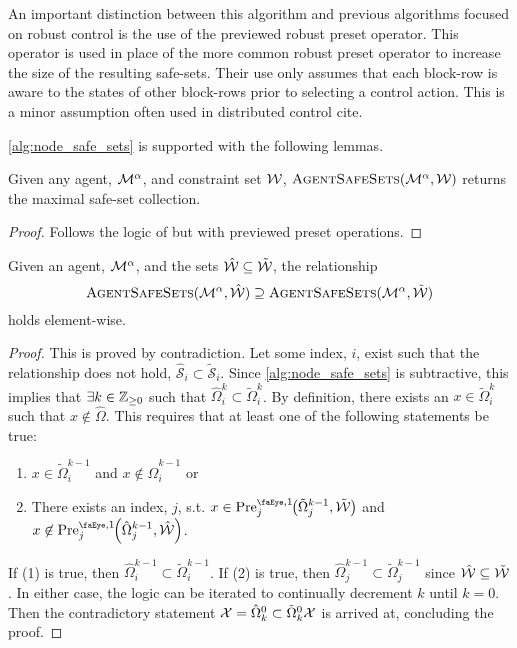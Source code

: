 \begin{remark}
An important distinction between this algorithm and previous algorithms focused on robust control is the use of the previewed robust preset operator. This operator is used in place of the more common robust preset operator to increase the size of the resulting safe-sets. Their use only assumes that each block-row is aware to the states of other block-rows prior to selecting a control action. This is a minor assumption often used in distributed control \alert{cite}.
\end{remark}
\autoref{alg:node_safe_sets} is supported with the following lemmas. 
\begin{lemma}
Given any agent, $\mathcal{M}^{\alpha}$, and constraint set $\wcon$, $\Call{AgentSafeSets}{\agent{\agentidx},\wcon}$ returns the maximal safe-set collection.
\end{lemma}
\begin{proof}
Follows the logic of \cite[Theorem 2]{Danielson2019} but with previewed preset operations.
\end{proof}
\begin{lemma}
Given an agent, $\mathcal{M}^{\alpha}$, and the sets $\hat\wcon\subseteq\tilde\wcon$, the relationship{\small
$$\Call{AgentSafeSets}{\agent{\agentidx},\hat\wcon}\supseteq\Call{AgentSafeSets}{\agent{\agentidx},\tilde\wcon}$$}
holds element-wise. 
\end{lemma}
\begin{proof}
This is proved by contradiction. Let some index, $i$, exist such that the relationship does not hold, $\hat{\mathcal{S}}_i\subset\tilde{\mathcal{S}}_i$. Since \autoref{alg:node_safe_sets} is subtractive, this implies that $\exists k\in\mathbb{Z}_{\geq 0}$ such that $\hat{\Omega}^k_i\subset\tilde{\Omega}^k_i$. By definition, there exists an $x\in\tilde{\Omega}^k_i$ such that $x\not\in\hat{\Omega}$. This requires that at least one of the following statements be true:
\begin{enumerate}
\item $x\in\tilde{\Omega}^{k-1}_i$ and $x\not\in\hat{\Omega}^{k-1}_i$ or
\item There exists an index, $j$, s.t. $x\in\PreviewedPre[j][1]{\tilde{\Omega}^{k-1}_j,\tilde{\mathcal{W}}}$ and $x\not\in\PreviewedPre[j][1]{\hat{\Omega}^{k-1}_j,\hat{\mathcal{W}}}$.
\end{enumerate}
If (1) is true, then $\hat{\Omega}^{k-1}_i\subset\tilde{\Omega}^{k-1}_i$. If (2) is true, then $\hat{\Omega}^{k-1}_j\subset\tilde{\Omega}^{k-1}_j$ since $\hat\wcon\subseteq\tilde\wcon$. In either case, the logic can be iterated to continually decrement $k$ until $k=0$. Then the contradictory statement $\xcon = \hat\Omega^0_k\subset\tilde{\Omega}^0_k\xcon$ is arrived at, concluding the proof. 
\end{proof}

